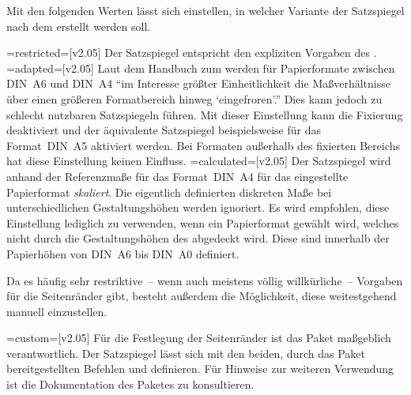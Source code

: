 \begin{DeclareEntity*}{}
\begin{DeclareEntity*}{}
\begin{DeclareEntity*}{}
\begin{Declaration}
%
Mit den folgenden Werten lässt sich einstellen, in welcher Variante der 
Satzspiegel nach dem \TUDCD erstellt werden soll. 
\begin{DeclareValues}
\itemval=restricted=[v2.05]
  Der Satzspiegel entspricht den expliziten Vorgaben des \CDs.
\itemval=adapted=[v2.05]
  Laut dem Handbuch zum \CD werden für Papierformate zwischen DIN~A6 und DIN~A4 
  \enquote{im Interesse größter Einheitlichkeit die Maßverhältnisse über einen 
  größeren Formatbereich hinweg \enquote{eingefroren}.} Dies kann jedoch zu 
  schlecht nutzbaren Satzspiegeln führen. Mit dieser Einstellung kann die 
  Fixierung deaktiviert und der äquivalente Satzspiegel beispielsweise für das 
  Format~DIN~A5 aktiviert werden. Bei Formaten außerhalb des fixierten Bereichs 
  hat diese Einstellung keinen Einfluss. 
\itemval=calculated=[v2.05]
  Der Satzspiegel wird anhand der Referenzmaße für das Format~DIN~A4 für das 
  eingestellte Papierformat \emph{skaliert}. Die eigentlich definierten 
  diskreten Maße bei unterschiedlichen Gestaltungshöhen werden ignoriert. Es 
  wird empfohlen, diese Einstellung lediglich zu verwenden, wenn ein 
  Papierformat gewählt wird, welches nicht durch die Gestaltungshöhen des 
  \TUDCDs abgedeckt wird. Diese sind innerhalb der Papierhöhen von DIN~A6 bis 
  DIN~A0 definiert.
\end{DeclareValues}

Da es häufig sehr restriktive~-- wenn auch meistens völlig willkürliche~-- 
Vorgaben für die Seitenränder gibt, besteht außerdem die Möglichkeit, diese 
weitestgehend manuell einzustellen. 
\begin{DeclareValues}
\itemval=custom=[v2.05]
  Für die Festlegung der Seitenränder ist das Paket  
  maßgeblich verantwortlich. Der Satzspiegel lässt sich mit den beiden, durch 
  das Paket bereitgestellten Befehlen  und  
  definieren. Für Hinweise zur weiteren Verwendung ist die Dokumentation des 
  Paketes zu konsultieren.
\end{DeclareValues}
\end{Declaration}



\end{DeclareEntity*}
\end{DeclareEntity*}
\end{DeclareEntity*}
